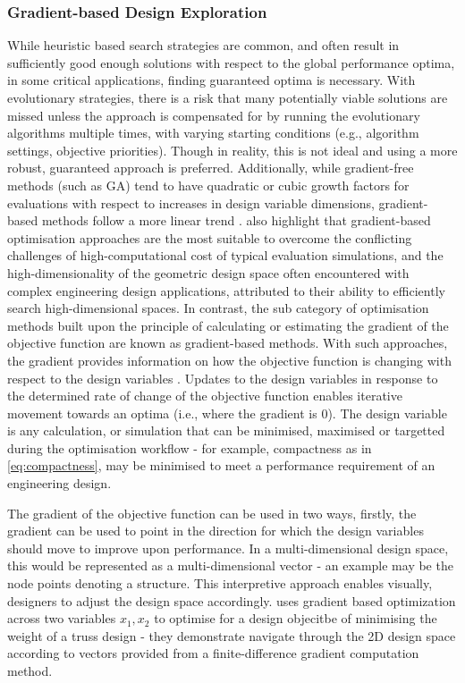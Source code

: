 \documentclass{article}
\begin{document}
\subsubsection{Gradient-based Design Exploration}
While heuristic based search strategies are common, and often result in sufficiently good enough solutions with respect to the global performance optima, in some critical applications, finding guaranteed optima is necessary. With evolutionary strategies, there is a risk that many potentially viable solutions are missed unless the approach is compensated for by running the evolutionary algorithms multiple times, with varying starting conditions (e.g., algorithm settings, objective priorities). Though in reality, this is not ideal and using a more robust, guaranteed approach is preferred. Additionally, while gradient-free methods (such as GA) tend to have quadratic or cubic growth factors for evaluations with respect to increases in design variable dimensions, gradient-based methods follow a more linear trend \citep{Li2022}. \cite{Li2022} also highlight that gradient-based optimisation approaches are the most suitable to overcome the conflicting challenges of high-computational cost of typical evaluation simulations, and the high-dimensionality of the geometric design space often encountered with complex engineering design applications, attributed to their ability to efficiently search high-dimensional spaces.
In contrast, the sub category of optimisation methods built upon the principle of calculating or estimating the gradient of the objective function are known as gradient-based methods. With such approaches, the gradient provides information on how the objective function is changing with respect to the design variables \citep{Brown:2018:2518-6582:1}. Updates to the design variables in response to the determined rate of change of the objective function enables iterative movement towards an optima (i.e., where the gradient is 0). The design variable is any calculation, or simulation that can be minimised, maximised or targetted during the optimisation workflow - for example, compactness as in \eqref{eq:compactness}, may be minimised to meet a performance requirement of an engineering design.

The gradient of the objective function can be used in two ways, firstly, the gradient can be used to point in the direction for which the design variables should move to improve upon performance. In a multi-dimensional design space, this would be represented as a multi-dimensional vector - an example may be the node points denoting a structure. This interpretive approach enables visually, designers to adjust the design space accordingly. \cite{Brown:2018:2518-6582:1} uses gradient based optimization across two variables $x_1,x_2$ to optimise for a design objecitbe of minimising the weight of a truss design - they demonstrate navigate through the 2D design space according to vectors provided from a finite-difference gradient computation method.
\end{document}
